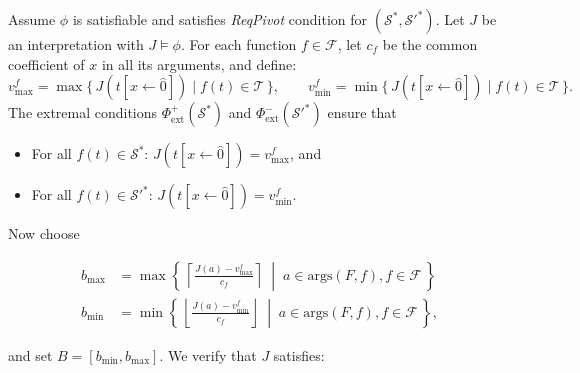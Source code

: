 \documentclass[runningheads]{llncs}
\newcommand{\args}{\text{args}}
\newcommand{\req}{\emph{ReqPivot}\xspace}
\newcommand{\subst}[3]{#1[#2\leftarrow #3]}
\newcommand{\repr}[1]{\hat{#1}}
\begin{document}
  Assume $\phi$ is satisfiable and satisfies \req condition for $(\mathcal{S}^*,\mathcal{S}'^*)$. Let $J$ be an interpretation with $J\models\phi$. For each function $f \in \mathcal{F}$, let $c_f$ be the common coefficient of $x$ in all its arguments, and define:
\[
v_{\max}^f = \max\{\, J(\subst{t}{x}{\repr{0}}) \mid f(t) \in \mathcal{T}\,\}, \qquad
v_{\min}^f = \min\{\, J(\subst{t}{x}{\repr{0}}) \mid f(t) \in \mathcal{T} \,\}.
\]
The extremal conditions $\Phi^+_{\text{ext}}(\mathcal{S}^*)$ and $\Phi^-_{\text{ext}}(\mathcal{S}'^*)$ ensure that
\begin{itemize}
    \item For all $f(t) \in \mathcal{S}^*$: $J(\subst{t}{x}{\repr{0}}) = v_{\max}^f$, and
    \item For all $f(t) \in \mathcal{S}'^*$: $J(\subst{t}{x}{\repr{0}}) = v_{\min}^f$.
\end{itemize}
Now choose
\begin{minipage}{\linewidth-2cm}
\vspace*{-0.5cm}  
\begin{align*}
  b_{\max} &= \max\left\{\, \left\lceil \frac{J(a) - v_{\max}^f}{c_f} \right\rceil \;\middle|\; a \in \args(F,f), f \in \mathcal{F} \,\right\}\\
b_{\min} &= \min\left\{\, \left\lfloor \frac{J(a) - v_{\min}^f}{c_f} \right\rfloor \;\middle|\; a \in \args(F,f), f \in \mathcal{F} \,\right\},
\end{align*}
\end{minipage}
and set $B = [b_{\min}, b_{\max}]$. We verify that $J$ satisfies:
\end{document}
